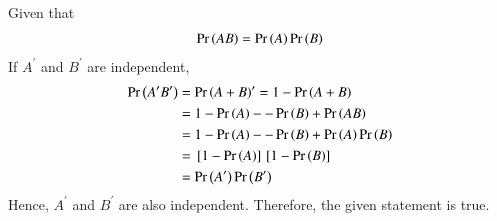 Given that 
\begin{align}
\Pr\left(AB\right) = \Pr\left(A\right)\Pr\left(B\right)
\end{align}
If $A^{\prime}$  and $B^{\prime}$ are independent,
\begin{align}
	\Pr\left(A^{\prime} B^{\prime}\right) &= \Pr\left(A+B\right)^{\prime}
	=1 - \Pr\left(A+B\right)
	\\
	&= 1 - \Pr\left(A\right)-
	 - \Pr\left(B\right) +  \Pr\left(AB\right)
	 \\
	&= 1 - \Pr\left(A\right)-
	 - \Pr\left(B\right) +  \Pr\left(A\right)\Pr\left(B\right)
	 \\
	&= {}\left[1 - \Pr\left(A\right)\right]
	{}\left[ 1 - \Pr\left(B\right)\right]  
	\\
	&=
\Pr\left(A^{\prime}\right) 
\Pr\left(B^{\prime}\right) 
\end{align}
Hence, $A^{\prime}$ and $B^{\prime}$ are also independent. 
Therefore, the given statement is true.


